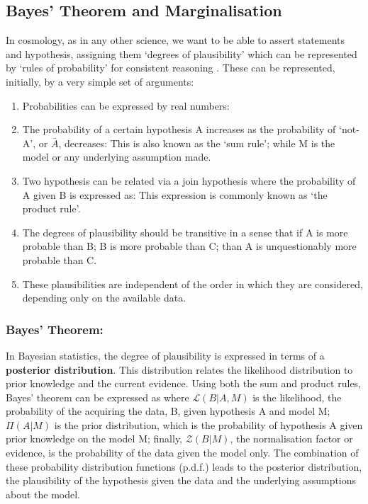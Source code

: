 \subsection{Bayes' Theorem and Marginalisation}
In cosmology, as in any other science, we want to be able to assert statements and hypothesis, assigning them `degrees of plausibility' which can be represented by `rules of probability' for consistent reasoning \citep{sivia2006data}. These can be represented, initially, by a very simple set of arguments:
\begin{enumerate}
\item Probabilities can be expressed by real numbers:
\item The probability of a certain hypothesis A increases as the probability of `not-A', or $\bar{A}$, decreases:
This is also known as the `sum rule'; while M is the model or any underlying assumption made.
\item Two hypothesis can be related via a join hypothesis where the probability of A given B is expressed as:
This expression is commonly known as `the product rule'.
\item The degrees of plausibility should be transitive in a sense that if A is more probable than B; B is more probable than C; than A is unquestionably more probable than C.

\item These plausibilities are independent of the order in which they are considered, depending only on the available data.
\end{enumerate}

\subsubsection{Bayes' Theorem:}
\qquad In Bayesian statistics, the degree of plausibility is expressed in terms of a \textbf{posterior distribution}. This distribution relates the likelihood distribution to prior knowledge and the current evidence. Using both the sum and product rules, Bayes' theorem can be expressed as
where $\mathcal{L}(B|A, M)$ is the likelihood, the probability of the acquiring the data, B, given hypothesis A and model M; $\Pi(A|M)$ is the prior distribution, which is the probability of hypothesis A given prior knowledge on the model M; finally, $\mathcal{Z}(B|M)$, the normalisation factor or evidence, is the probability of the data given the model only. The combination of these probability distribution functions (p.d.f.) leads to the posterior distribution, the plausibility of the hypothesis given the data and the underlying assumptions about the model. 

